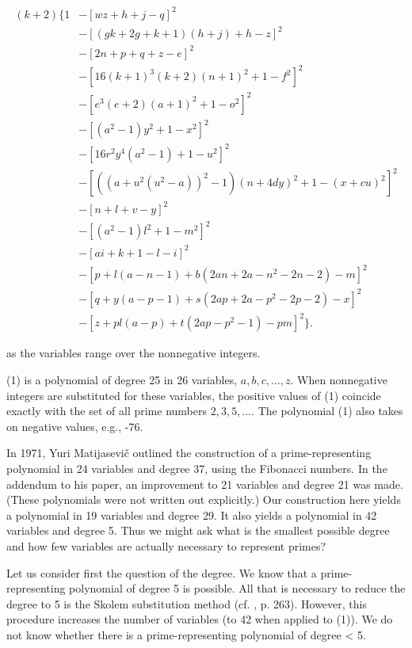 \documentclass[10pt,letterpaper]{article}
\begin{document}
\begin{equation}
\begin{aligned}
(k+2)\bigl\{1
 &-[wz+h+j-q]^2\\
 &-[(gk+2g+k+1)(h+j)+h-z]^2\\
 &-[2n+p+q+z-e]^2\\
 &-[16(k+1)^3(k+2)(n+1)^2+1-f^2]^2\\
 &-[e^3(e+2)(a+1)^2+1-o^2]^2\\
 &-[(a^2-1)y^2+1-x^2]^2\\
 &-[16r^2y^4(a^2-1)+1-u^2]^2\\
 &-[((a+u^2(u^2-a))^2-1)(n+4dy)^2+1-(x+cu)^2]^2\\
 &-[n+l+v-y]^2\\
 &-[(a^2-1)l^2+1-m^2]^2\\
 &-[ai+k+1-l-i]^2\\
 &-[p+l(a-n-1)+b(2an+2a-n^2-2n-2)-m]^2\\
 &-[q+y(a-p-1)+s(2ap+2a-p^2-2p-2)-x]^2\\
 &-[z+pl(a-p)+t(2ap-p^2-1)-pm]^2\bigr\}.
\end{aligned}\tag{1}\label{eq:prime-polynomial}
\end{equation}

as the variables range over the nonnegative integers.

(1) is a polynomial of degree 25 in 26 variables, $a, b, c, \ldots, z$. When nonnegative integers are substituted for these variables, the positive values of (1) coincide exactly with the set of all prime numbers $2,3,5, \ldots$. The polynomial (1) also takes on negative values, e.g., -76.

In 1971, Yuri Matijasevič \cite{ref10} outlined the construction of a prime-representing polynomial in 24 variables and degree 37, using the Fibonacci numbers. In the addendum to his paper, an improvement to 21 variables and degree 21 was made. (These polynomials were not written out explicitly.) Our construction here yields a polynomial in 19 variables and degree 29. It also yields a polynomial in 42 variables and degree 5. Thus we might ask what is the smallest possible degree and how few variables are actually necessary to represent primes?

Let us consider first the question of the degree. We know that a prime-representing polynomial of degree 5 is possible. All that is necessary to reduce the degree to 5 is the Skolem substitution method (cf. \cite{ref3}, p. 263). However, this procedure increases the number of variables (to 42 when applied to (1)). We do not know whether there is a prime-representing polynomial of degree < 5.
\end{document}
